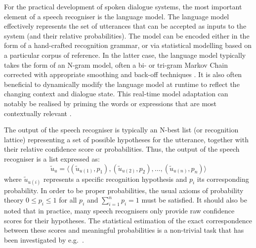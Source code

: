 
For the practical development of spoken dialogue systems, the most important element of a speech recogniser is the language model.  The language model effectively represents the set of utterances that can be accepted as inputs to the system (and their relative probabilities).  The model can be encoded either in the form of a hand-crafted recognition grammar, or via statistical modelling based on a particular corpus of reference.  In the latter case, the language model typically takes the form of an N-gram model, often a bi- or tri-gram Markov Chain corrected with appropriate smoothing and back-off techniques  \citep{Jelinek:1998,ChenG99}.  It is also often beneficial to dynamically modify the language model at runtime to reflect the changing context and dialogue state.  This real-time model adaptation can notably be realised by priming the words or expressions that are most contextually relevant \citep{gruenstein2005context,ESSLLI2008-springerreprint}.

The output of the speech recogniser is typically an N-best list (or recognition lattice) representing a set of possible hypotheses for the utterance, together with their relative confidence score or probabilities.  Thus, the output of the speech recogniser is a list expressed as: 
\begin{equation*}
\tilde{u}_u = \langle (\tilde{u}_{u(1)}, p_{1}), (\tilde{u}_{u(2)}, p_{2}), \dots, (\tilde{u}_{u(n)}, p_{n})\rangle
\end{equation*}
where $\tilde{u}_{u(i)}$ represents a specific recognition hypothesis and $p_{i}$ its corresponding probability. In order to be proper probabilities,  the usual axioms of probability theory $0 \leq p_{i} \leq 1$ for all $p_{i}$ and $\sum_{i=1}^n p_{i} = 1$ must be satisfied.   It should also be noted that in practice, many speech recognisers only provide raw confidence scores for their hypotheses.  The statistical estimation of the exact correspondence between these scores and meaningful probabilities is a non-trivial task that has been investigated by e.g.\ \cite{Williams08}. 

